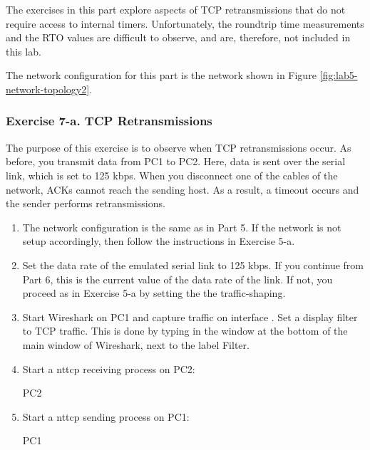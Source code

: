 The exercises in this part explore aspects of TCP retransmissions that do not require access to internal timers. Unfortunately, the roundtrip time measurements and the RTO values are difficult to observe, and are, therefore, not included in this lab.

The network configuration for this part is the network shown in Figure \ref{fig:lab5-network-topology2}.

\subsubsection{Exercise 7-a. TCP Retransmissions}

The purpose of this exercise is to observe when TCP retransmissions occur. As before, you transmit data from PC1 to PC2. Here, data is sent over the serial link, which is set to 125 kbps. When you disconnect one of the cables of the network, ACKs cannot reach the sending host. As a result, a timeout occurs and the sender performs retransmissions.

\begin{enumerate}
	\item The network configuration is the same as in Part 5. If the network is not setup accordingly, then follow the instructions in Exercise 5-a.
	\item Set the data rate of the emulated serial link to 125 kbps. If you continue from Part 6, this is the current value of the data rate of the link. If not, you proceed as in Exercise 5-a by setting the the traffic-shaping.
	\item Start Wireshark on PC1 and capture traffic on interface . Set a display filter to TCP traffic. This is done by typing  in the window at the bottom of the main window of Wireshark, next to the label Filter.
	\item Start a nttcp receiving process on PC2:
		\begin{cmdblock}
	PC2%
		\end{cmdblock}
	\item Start a nttcp sending process on PC1:
		\begin{cmdblock}
	PC1%
		\end{cmdblock}
\end{enumerate}

\begin{questions}
\end{questions}

